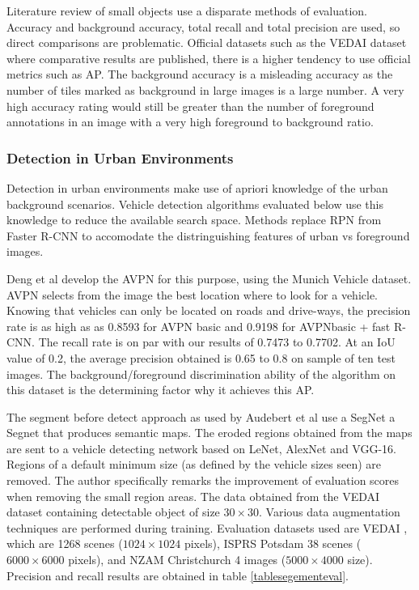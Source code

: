 \documentclass{IEEEtran}
\begin{document}
Literature review of small objects use a disparate methods of evaluation. Accuracy and background accuracy, total recall and total precision are used, so direct comparisons are problematic. Official datasets such as the VEDAI dataset \cite{razakarivony2016vehicle} where comparative results are published, there is a higher tendency to use official metrics such as AP. The background accuracy is a misleading accuracy as the number of tiles marked as background in large images is a large number. A very high accuracy rating would still be greater than the number of foreground annotations in an image with a very high foreground to background ratio.\newline

\subsubsection{Detection in Urban Environments}

Detection in urban environments make use of apriori knowledge of the urban background scenarios. Vehicle detection algorithms evaluated below use this knowledge to reduce the available search space. Methods replace RPN from Faster R-CNN to accomodate the distringuishing features of urban vs foreground images. \newline

Deng et al \cite{Deng2017} develop the AVPN for this purpose, using the Munich Vehicle dataset. AVPN selects from the image the best location where to look for a vehicle. Knowing that vehicles can only be located on roads and drive-ways,  the precision rate is as high as as 0.8593 for AVPN basic and 0.9198 for AVPNbasic + fast R-CNN. The recall rate is on par with our results of 0.7473 to 0.7702. At an IoU value of 0.2, the average precision obtained is 0.65 to 0.8 on sample of ten test images. The background/foreground discrimination ability of the algorithm on this dataset is the determining factor why it achieves this AP. \newline

The segment before detect approach as used by Audebert et al \cite{Audebert2017} use a SegNet a Segnet that produces semantic maps. The eroded regions obtained from the maps are sent to a vehicle detecting network based on LeNet, AlexNet and VGG-16. Regions of a default minimum size (as defined by the vehicle sizes seen) are removed. The author specifically remarks the improvement of evaluation scores when removing the small region areas. The data obtained from the VEDAI dataset \cite{razakarivony2016vehicle} containing detectable object of size $30 \times 30$. Various data augmentation techniques are  performed during training. Evaluation datasets used are VEDAI \cite{Razakarivony2015}, which are 1268 scenes ($1024 \times 1024$ pixels), ISPRS Potsdam 38 scenes ($6000 \times 6000$ pixels), and NZAM Christchurch 4 images ($5000 \times 4000$ size). Precision and recall results are obtained in table \ref{tablesegementeval}.
\end{document}
